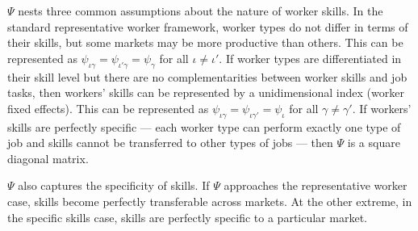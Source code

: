 \documentclass[12pt]{article}
\def\ig{\iota\gamma}
\def\g{\gamma}
\def\i{\iota}
\theoremstyle{definition}
\theoremstyle{plain}
\begin{document}
$\Psi$ nests three common assumptions about the nature of worker skills. In the standard representative worker framework, worker types do not differ in terms of their skills, but some markets may be more productive than others. This can be represented as $\psi_{\ig} = \psi_{\i'\g} = \psi_{\g}$ for all $\i\neq\i'$. If worker types are differentiated in their skill level but there are no complementarities between worker skills and job tasks, then workers' skills can be represented by a unidimensional index (worker fixed effects). This can be represented as $\psi_{\ig} = \psi_{\ig'} = \psi_{\i}$ for all $\g\neq\g'$. If workers' skills are perfectly specific --- each worker type can perform exactly one type of job and skills cannot be transferred to other types of jobs --- then $\Psi$ is a square diagonal matrix.  $\Psi$ also captures the specificity of skills. If $\Psi$ approaches the representative worker case, skills become perfectly transferable across markets. At the other extreme, in the specific skills case, skills are perfectly specific to a particular market.
\end{document}
